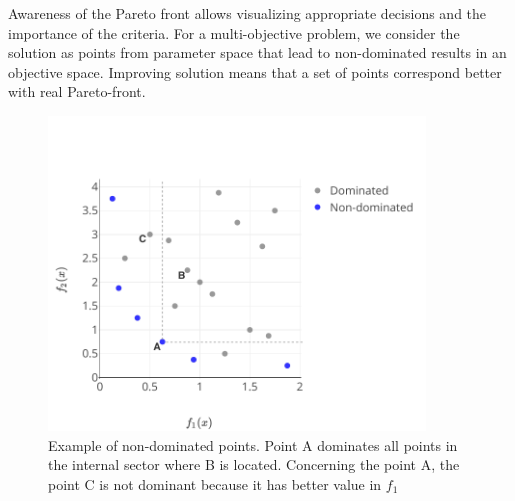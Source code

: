         Awareness of the Pareto front allows visualizing appropriate decisions and the importance of the criteria. For a multi-objective problem, we consider the solution as points from parameter space that lead to non-dominated results in an objective space. Improving solution means that a set of points correspond better with real Pareto-front.

        \begin{figure}
            \centering 
            \includegraphics[width=10cm]{content/images/ndom}
            \caption[Non-dominated points]{Example of non-dominated points. Point A dominates all points in the internal sector where B is located. Concerning the point A, the point C is not dominant because it has better value in $f_1$} 
            \label{fig:dominated} 
        \end{figure}



